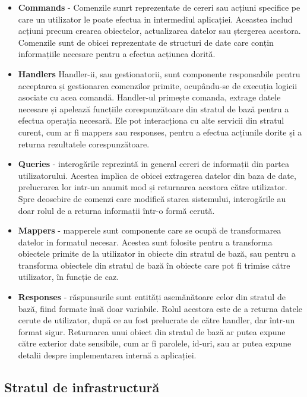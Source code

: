 \begin{itemize}
    \item \textbf{Commands} - Comenzile sunrt reprezentate de cereri sau acțiuni specifice pe care un utilizator le poate efectua in intermediul aplicației. Aceastea includ acțiuni precum crearea obiectelor, actualizarea datelor sau ștergerea acestora. Comenzile sunt de obicei reprezentate de structuri de date care conțin informațiile necesare pentru a efectua acțiunea dorită.
    \item \textbf{Handlers} Handler-ii, sau gestionatorii, sunt componente responsabile pentru acceptarea și gestionarea comenzilor primite, ocupându-se de execuția logicii asociate cu acea comandă. Handler-ul primește comanda, extrage datele necesare și apelează funcțiile corespunzătoare din stratul de bază pentru a efectua operația necesară. Ele pot interacționa cu alte servicii din stratul curent, cum ar fi mappers sau responses, pentru a efectua acțiunile dorite și a returna rezultatele corespunzătoare.
    \item \textbf{Queries} - interogările reprezintă in general cereri de informații din partea utilizatorului. Acestea implica de obicei extragerea datelor din baza de date, prelucrarea lor intr-un anumit mod și returnarea acestora către utilizator. Spre deosebire de comenzi care modifică starea sistemului, interogările au doar rolul de a returna informații într-o formă cerută.
    \item \textbf{Mappers} - mapperele sunt componente care se ocupă de transformarea datelor in formatul necesar. Acestea sunt folosite pentru a transforma obiectele primite de la utilizator in obiecte din stratul de bază, sau pentru a transforma obiectele din stratul de bază în obiecte care pot fi trimise către utilizator, în funcție de caz.
    
    \newpage

    \item \textbf{Responses} - răspunsurile sunt entități asemănătoare celor din stratul de bază, fiind formate însă doar variabile. Rolul acestora este de a returna datele cerute de utilizator, după ce au fost prelucrate de către handler, dar într-un format sigur. Returnarea unui obiect din stratul de bază ar putea expune către exterior date sensibile, cum ar fi parolele, id-uri, sau ar putea expune detalii despre implementarea internă a aplicației.
\end{itemize}

\subsection{Stratul de infrastructură}

